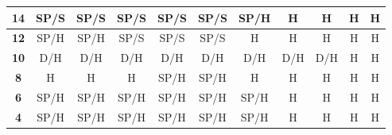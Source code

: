 \documentclass[conference]{IEEEtran}
\begin{document}
\begin{table}[htbp]
\begin{tabular}{|c|c|c|c|c|c|c|c|c|c|c|}
\textbf{14} & \cellcolor[HTML]{F8FF00}SP/S & \cellcolor[HTML]{F8FF00}SP/S & \cellcolor[HTML]{F8FF00}SP/S & \cellcolor[HTML]{F8FF00}SP/S & \cellcolor[HTML]{F8FF00}SP/S & \cellcolor[HTML]{F8FF00}SP/H & \cellcolor[HTML]{FE0000}H & \cellcolor[HTML]{FE0000}H & \cellcolor[HTML]{FE0000}H & \cellcolor[HTML]{FE0000}H \\ \hline
\textbf{12} & \cellcolor[HTML]{F8FF00}SP/H & \cellcolor[HTML]{F8FF00}SP/H & \cellcolor[HTML]{F8FF00}SP/S & \cellcolor[HTML]{F8FF00}SP/S & \cellcolor[HTML]{F8FF00}SP/S & \cellcolor[HTML]{FE0000}H & \cellcolor[HTML]{FE0000}H & \cellcolor[HTML]{FE0000}H & \cellcolor[HTML]{FE0000}H & \cellcolor[HTML]{FE0000}H \\ \hline
\textbf{10} & \cellcolor[HTML]{FFC702}D/H & \cellcolor[HTML]{FFC702}D/H & \cellcolor[HTML]{FFC702}D/H & \cellcolor[HTML]{FFC702}D/H & \cellcolor[HTML]{FFC702}D/H & \cellcolor[HTML]{FFC702}D/H & \cellcolor[HTML]{FFC702}D/H & \cellcolor[HTML]{FFC702}D/H & \cellcolor[HTML]{FE0000}H & \cellcolor[HTML]{FE0000}H \\ \hline
\textbf{8} & \cellcolor[HTML]{FE0000}H & \cellcolor[HTML]{FE0000}H & \cellcolor[HTML]{FE0000}H & \cellcolor[HTML]{F8FF00}SP/H & \cellcolor[HTML]{F8FF00}SP/H & \cellcolor[HTML]{FE0000}H & \cellcolor[HTML]{FE0000}H & \cellcolor[HTML]{FE0000}H & \cellcolor[HTML]{FE0000}H & \cellcolor[HTML]{FE0000}H \\ \hline
\textbf{6} & \cellcolor[HTML]{F8FF00}SP/H & \cellcolor[HTML]{F8FF00}SP/H & \cellcolor[HTML]{F8FF00}SP/H & \cellcolor[HTML]{F8FF00}SP/H & \cellcolor[HTML]{F8FF00}SP/H & \cellcolor[HTML]{F8FF00}SP/H & \cellcolor[HTML]{FE0000}H & \cellcolor[HTML]{FE0000}H & \cellcolor[HTML]{FE0000}H & \cellcolor[HTML]{FE0000}H \\ \hline
\textbf{4} & \cellcolor[HTML]{F8FF00}SP/H & \cellcolor[HTML]{F8FF00}SP/H & \cellcolor[HTML]{F8FF00}SP/H & \cellcolor[HTML]{F8FF00}SP/H & \cellcolor[HTML]{F8FF00}SP/H & \cellcolor[HTML]{F8FF00}SP/H & \cellcolor[HTML]{FE0000}H & \cellcolor[HTML]{FE0000}H & \cellcolor[HTML]{FE0000}H & \cellcolor[HTML]{FE0000}H \\ \hline
\end{tabular}
\end{table}
\end{document}
